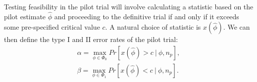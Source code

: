 \documentclass[AMA,STIX1COL]{WileyNJD-v2}
\begin{document}
Testing feasibility in the pilot trial will involve calculating a statistic based on the pilot estimate $\hat{\phi}$ and proceeding to the definitive trial if and only if it exceeds some pre-specified  critical value $c$. A natural choice of statistic is $x(\hat{\phi})$. We can then define the type I and II error rates of the pilot trial:
\begin{align}\label{eqn:ocs}
\alpha = \max_{\phi \in \Phi_0} Pr[ x(\hat{\phi}) > c ~ | ~ \phi, n_p], \\
\beta = \max_{\phi \in \Phi_1} Pr[ x(\hat{\phi}) < c ~ | ~ \phi, n_p].
\end{align}

\end{document}
